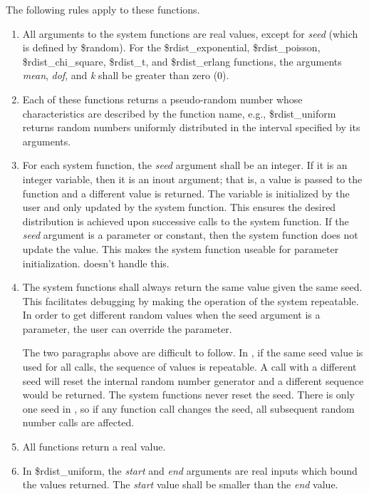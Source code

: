 \begin{description}
The following rules apply to these functions.
\begin{enumerate}
\item{All arguments to the system functions are real values, except
for {\it seed} (which is defined by {\vt \$random}).  For the {\vt
\$rdist\_exponential}, {\vt \$rdist\_poisson}, {\vt
\$rdist\_chi\_square}, {\vt \$rdist\_t}, and {\vt \$rdist\_erlang}
functions, the arguments {\it mean}, {\it dof}, and {\it k} shall be
greater than zero (0).}

\item{Each of these functions returns a pseudo-random number whose
characteristics are described by the function name, e.g., {\vt
\$rdist\_uniform} returns random numbers uniformly distributed in the
interval specified by its arguments.}

\item{For each system function, the {\it seed} argument shall be an
integer.  If it is an integer variable, then it is an inout argument;
that is, a value is passed to the function and a different value is
returned.  The variable is initialized by the user and only updated by
the system function.  This ensures the desired distribution is
achieved upon successive calls to the system function.  If the {\it
seed} argument is a parameter or constant, then the system function
does not update the value.  This makes the system function useable for
parameter initialization.  {\WRspice} doesn't handle this.}

\item{The system functions shall always return the same value given
the same seed.  This facilitates debugging by making the operation of
the system repeatable.  In order to get different random values when
the seed argument is a parameter, the user can override the
parameter.

The two paragraphs above are difficult to follow.  In {\WRspice}, if
the same seed value is used for all calls, the sequence of values is
repeatable.  A call with a different seed will reset the internal
random number generator and a different sequence would be returned. 
The system functions never reset the seed.  There is only one seed in
{\WRspice}, so if any function call changes the seed, all subsequent
random number calls are affected.}

\item{All functions return a real value.}

\item{In {\vt \$rdist\_uniform}, the {\it start} and {\it end}
arguments are real inputs which bound the values returned.  The {\it
start} value shall be smaller than the {\it end} value.}


\end{enumerate}
\end{description}
